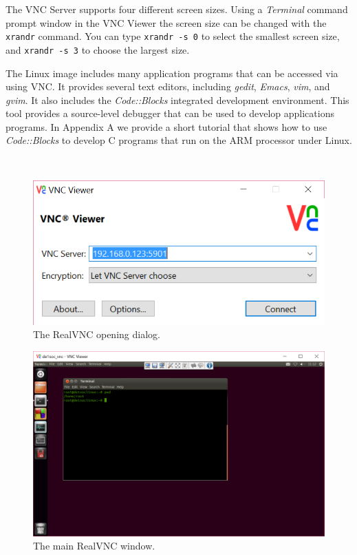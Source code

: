 \documentclass[11pt, twoside, pdftex]{article}
\begin{document}
The VNC Server supports four different screen sizes. Using a {\it Terminal} command prompt 
window in the VNC Viewer the screen size can be changed with the \texttt{xrandr} command. 
You can type \texttt{xrandr~-s~0} to select the smallest screen size, and \texttt{xrandr -s 3}
to choose the largest size.

The Linux image includes many application programs that can be accessed via using VNC.
It provides several text editors, including {\it gedit}, {\it Emacs}, {\it vim}, and 
{\it gvim}.  It also includes the {\it Code::Blocks} integrated development environment. 
This tool provides a source-level debugger that can be used to develop applications programs. In
Appendix A we provide a short tutorial that shows how to use {\it Code::Blocks} to develop
C programs that run on the ARM processor under Linux. 

~\\
\begin{figure}[H]
   \begin{center}
       \includegraphics[scale=0.5]{figures/VNC_1}
   \end{center}
   \caption{The RealVNC opening dialog.}
	\label{fig:VNC_1}
\end{figure}

\begin{figure}[H]
   \begin{center}
       \includegraphics[scale=0.5]{figures/VNC_2}
   \end{center}
   \caption{The main RealVNC window.}
	\label{fig:VNC_2}
\end{figure}
\end{document}
